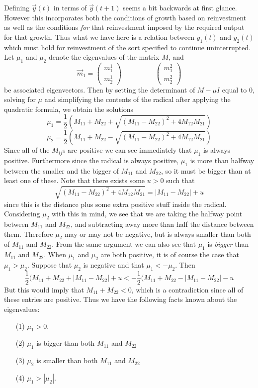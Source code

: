 Defining $\vec{y}(t)$ in terms of $\vec{y}(t+1)$ seems a bit backwards at first glance. However this incorporates both the conditions of growth based on reinvestment as well as the conditions \emph{for} that reinvestment imposed by the required output for that growth. Thus what we have here is a relation between $y_1(t)$ and $y_2(t)$ which must hold for reinvestment of the sort specified to continue uninterrupted. Let $\mu_1$ and $\mu_2$ denote the eigenvalues of the matrix $M$, and 
\[ \vec{m}_1 = \begin{pmatrix} m^1_1 \\ m^1_2 \end{pmatrix}  \hspace{2cm} \begin{pmatrix} m^2_1 \\ m^2_2 \end{pmatrix} \]
be associated eigenvectors. Then by setting the determinant of $M-\mu I$ equal to $0$, solving for $\mu$ and simplifying the contents of the radical after applying the quadratic formula, we obtain the solutions
\[ \mu_1 =  \frac{1}{2}(M_{11}+M_{22}+\sqrt{(M_{11}-M_{22})^2 + 4M_{12}M_{21}}) \]
\[ \mu_2 =  \frac{1}{2}(M_{11}+M_{22}-\sqrt{(M_{11}-M_{22})^2 + 4M_{12}M_{21}}) \]
Since all of the $M_{ij}$s are positive we can see immediately that $\mu_1$ is always positive. Furthermore since the radical is always positive, $\mu_1$ is more than halfway between the smaller and the bigger of $M_{11}$ and $M_{22}$, so it must be bigger than at least one of these. Note that there exists some $u>0$ such that 
\[ \sqrt{(M_{11}-M_{22})^2 + 4M_{12}M_{21}} = |M_{11} - M_{22}| + u \]
since this is the distance plus some extra positive stuff inside the radical. Considering $\mu_2$ with this in mind, we see that we are taking the halfway point between $M_{11}$ and $M_{22}$, and subtracting away more than half the distance between them. Therefore $\mu_2$ may or may not be negative, but is always smaller than  both of $M_{11}$ and $M_{22}$. From the same argument we can also see that $\mu_1$ is \emph{bigger} than $M_{11}$ and $M_{22}$. When $\mu_1$ and $\mu_2$ are both positive, it is of course the case that $\mu_1 > \mu_2$. Suppose that $\mu_2$ is negative and that $\mu_1 < -\mu_2$. Then 
\[ \frac{1}{2}(M_{11}+M_{22}+|M_{11} - M_{22}| + u < -\frac{1}{2}(M_{11}+M_{22}-|M_{11} - M_{22}| - u \]
But this would imply that $M_{11} + M_{22} < 0$, which is a contradiction since all of these entries are positive. Thus we have the following facts known about the eigenvalues:
\begin{itemize}
	\item[(1)] $\mu_1 > 0$.
	\item[(2)] $\mu_1$ is bigger than both $M_{11}$ and $M_{22}$
	\item[(3)] $\mu_2$ is smaller than both $M_{11}$ and $M_{22}$
	\item[(4)] $\mu_1 > |\mu_2|$.
\end{itemize}
